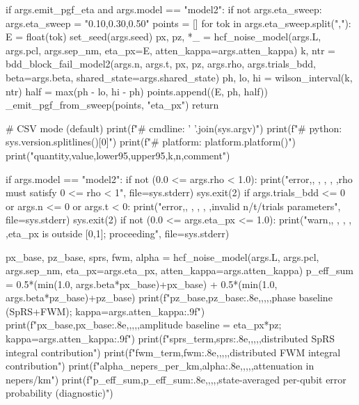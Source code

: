 {{{{    if args.emit_pgf_eta and args.model == "model2":
        if not args.eta_sweep:
            args.eta_sweep = "0.10,0.30,0.50"
        points = []
        for tok in args.eta_sweep.split(","):
            E = float(tok)
            set_seed(args.seed)
            px, pz, *_ = hcf_noise_model(args.L, args.pcl, args.sep_nm, eta_px=E, atten_kappa=args.atten_kappa)
            k, ntr = bdd_block_fail_model2(args.n, args.t, px, pz, args.rho, args.trials_bdd, beta=args.beta, shared_state=args.shared_state)
            ph, lo, hi = wilson_interval(k, ntr)
            half = max(ph - lo, hi - ph)
            points.append((E, ph, half))
        _emit_pgf_from_sweep(points, "eta_px")
        return

    # CSV mode (default)
    print(f"# cmdline: {' '.join(sys.argv)}")
    print(f"# python: {sys.version.splitlines()[0]}")
    print(f"# platform: {platform.platform()}")
    print("quantity,value,lower95,upper95,k,n,comment")

    if args.model == "model2":
        if not (0.0 <= args.rho < 1.0):
            print("error,, , , , ,rho must satisfy 0 <= rho < 1", file=sys.stderr)
            sys.exit(2)
        if args.trials_bdd <= 0 or args.n <= 0 or args.t < 0:
            print("error,, , , , ,invalid n/t/trials parameters", file=sys.stderr)
            sys.exit(2)
        if not (0.0 <= args.eta_px <= 1.0):
            print("warn,, , , , ,eta_px is outside [0,1]; proceeding", file=sys.stderr)

        px_base, pz_base, sprs, fwm, alpha = hcf_noise_model(args.L, args.pcl, args.sep_nm,
                                                             eta_px=args.eta_px, atten_kappa=args.atten_kappa)
        p_eff_sum = 0.5*(min(1.0, args.beta*px_base)+px_base) + 0.5*(min(1.0, args.beta*pz_base)+pz_base)
        print(f"pz_base,{pz_base:.8e},,,,,phase baseline (SpRS+FWM); kappa={args.atten_kappa:.9f}")
        print(f"px_base,{px_base:.8e},,,,,amplitude baseline = eta_px*pz; kappa={args.atten_kappa:.9f}")
        print(f"sprs_term,{sprs:.8e},,,,,distributed SpRS integral contribution")
        print(f"fwm_term,{fwm:.8e},,,,,distributed FWM integral contribution")
        print(f"alpha_nepers_per_km,{alpha:.8e},,,,,attenuation in nepers/km")
        print(f"p_eff_sum,{p_eff_sum:.8e},,,,,state-averaged per-qubit error probability (diagnostic)")

}}}}
